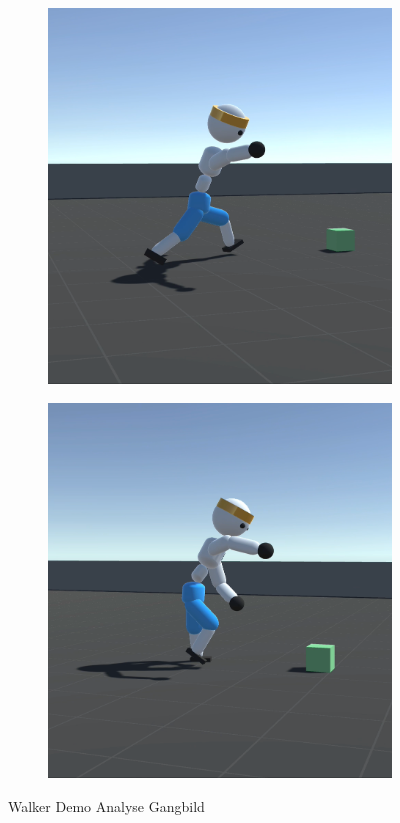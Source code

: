\begin{figure}[H]
\begin{subfigure}{.3\textwidth}
  \end{subfigure}
  \begin{subfigure}{.3\textwidth}
    \centering
    \includegraphics[width=\textwidth]{img/charakter_walker_5}
  \end{subfigure}
  \begin{subfigure}{.3\textwidth}
    \centering
    \includegraphics[width=\textwidth]{img/charakter_walker_6}
  \end{subfigure}
  \caption{Walker Demo Analyse Gangbild}
  \label{fig:analyse_gangbild}
\end{figure}
  